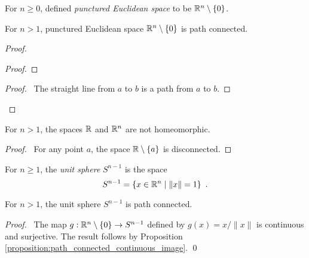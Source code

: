 \begin{definition}
    For $n \geq 0$, defined \emph{punctured Euclidean space} to be $\mathbb{R}^n \setminus \{ 0 \}$.
\end{definition}

\begin{proposition}
    For $n > 1$, punctured Euclidean space $\mathbb{R}^n \setminus \{ 0 \}$ is path connected.
\end{proposition}

\begin{proof}
    \pf
    \begin{proof}
    \end{proof}
    \begin{proof}
        \pf\ The straight line from $a$ to $b$ is a path from $a$ to $b$.
    \end{proof}
\end{proof}

\begin{corollary}
    For $n > 1$, the spaces $\mathbb{R}$ and $\mathbb{R}^n$ are not homeomorphic.
\end{corollary}

\begin{proof}
    \pf\ For any point $a$, the space $\mathbb{R} \setminus \{a\}$ is disconnected.
\end{proof}

\begin{definition}
    For $n \geq 1$, the \emph{unit sphere} $S^{n-1}$ is the space
    \[ S^{n-1} = \{ x \in \mathbb{R}^n \mid \| x \| = 1 \} \enspace . \]
\end{definition}

\begin{proposition}
    For $n > 1$, the unit sphere $S^{n-1}$ is path connected.
\end{proposition}

\begin{proof}
    \pf\ The map $g : \mathbb{R}^n \setminus \{ 0 \} \rightarrow S^{n-1}$ defined by $g(x) = x / \| x \|$ is continuous and surjective. The result follows by Proposition
    \ref{proposition:path_connected_continuous_image}. \qed
\end{proof}


